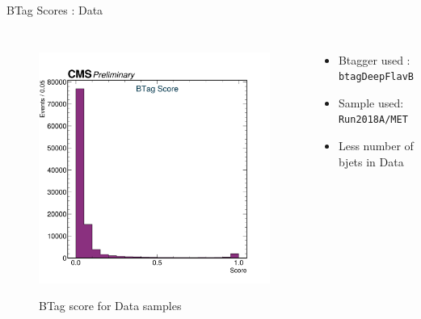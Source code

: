 \documentclass[10pt,xcolor=dvipsnames]{beamer}
\begin{document}
    
  \begin{frame}[fragile]{BTag Scores : Data} 
    \begin{columns}
      \begin{figure} 
        \centering 
        \includegraphics[width=1\textwidth]{../Archive/KinemPlots/TagData.png }
        \label{TagData} 
        \caption{BTag score for Data samples}
      \end{figure} 
      \begin{itemize} 
        \raggedright 
        \small
        \item {Btagger used : \texttt{btagDeepFlavB}} 
        \item {Sample used: \texttt{Run2018A/MET}} 
        \item Less number of bjets in Data
      \end{itemize}
    \end{columns} 
  \end{frame} 
    
\end{document}

